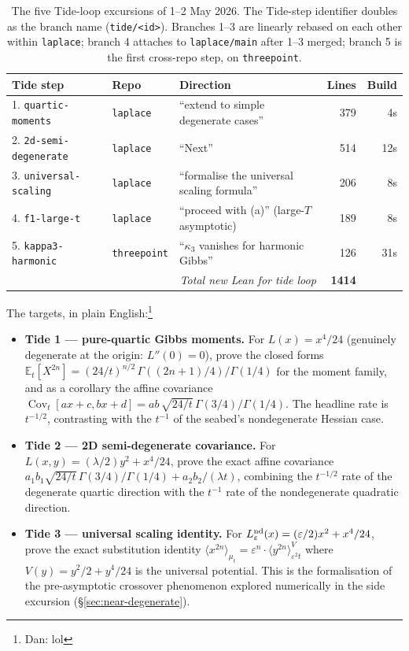 \documentclass[11pt]{article}
\begin{document}
\begin{table}[h]
\centering
\renewcommand{\arraystretch}{1.2}
\begin{tabular}{l l l r r}
\toprule
\textbf{Tide step} & \textbf{Repo} & \textbf{Direction} & \textbf{Lines} & \textbf{Build}\\
\midrule
1. \texttt{quartic-moments}    & \texttt{laplace}    & ``extend to simple degenerate cases'' & 379 & 4s\\
2. \texttt{2d-semi-degenerate} & \texttt{laplace}    & ``Next''  & 514 & 12s\\
3. \texttt{universal-scaling}  & \texttt{laplace}    & ``formalise the universal scaling formula'' & 206 & 8s\\
4. \texttt{f1-large-t}         & \texttt{laplace}    & ``proceed with (a)'' (large-$T$ asymptotic) & 189 & 8s\\
5. \texttt{kappa3-harmonic}    & \texttt{threepoint} & ``$\kappa_3$ vanishes for harmonic Gibbs'' & 126 & 31s\\
\midrule
\multicolumn{3}{r}{\emph{Total new Lean for tide loop}} & \textbf{1414} & \\
\bottomrule
\end{tabular}
\caption{The five Tide-loop excursions of 1--2 May 2026. The Tide-step
identifier doubles as the branch name (\texttt{tide/<id>}). Branches
1--3 are linearly rebased on each other within \texttt{laplace}; branch
4 attaches to \texttt{laplace/main} after 1--3 merged; branch 5 is the
first cross-repo step, on \texttt{threepoint}.}
\label{tab:excursions}
\end{table}

The targets, in plain English:\footnote{Dan: lol}

\begin{itemize}
\item \textbf{Tide 1 --- pure-quartic Gibbs moments.} For
$L(x) = x^4/24$ (genuinely degenerate at the origin: $L''(0) = 0$),
prove the closed forms $\mathbb{E}_t[X^{2n}] = (24/t)^{n/2}\,
\Gamma((2n+1)/4)/\Gamma(1/4)$ for the moment family, and as a
corollary the affine covariance $\operatorname{Cov}_t[ax+c, bx+d]
= ab\,\sqrt{24/t}\,\Gamma(3/4)/\Gamma(1/4)$. The headline rate is
$t^{-1/2}$, contrasting with the $t^{-1}$ of the seabed's nondegenerate
Hessian case.
\item \textbf{Tide 2 --- 2D semi-degenerate covariance.} For
$L(x,y) = (\lambda/2)y^2 + x^4/24$, prove the exact affine covariance
$a_1 b_1 \sqrt{24/t}\,\Gamma(3/4)/\Gamma(1/4) + a_2 b_2/(\lambda t)$,
combining the $t^{-1/2}$ rate of the degenerate quartic direction with
the $t^{-1}$ rate of the nondegenerate quadratic direction.
\item \textbf{Tide 3 --- universal scaling identity.} For
$L^{\rm nd}_\varepsilon(x) = (\varepsilon/2)x^2 + x^4/24$, prove the
exact substitution identity $\langle x^{2n}\rangle_{\mu_t} =
\varepsilon^n \cdot \langle y^{2n}\rangle^V_{\varepsilon^2 t}$ where
$V(y) = y^2/2 + y^4/24$ is the universal potential. This is the
formalisation of the pre-asymptotic crossover phenomenon explored
numerically in the side excursion (\S\ref{sec:near-degenerate}).
\end{itemize}
\end{document}
